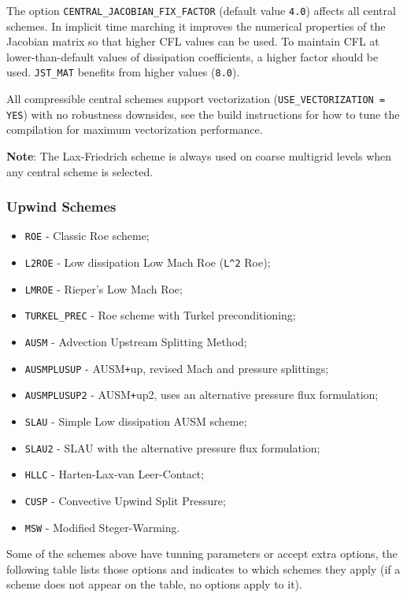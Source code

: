\documentclass[12pt, a4paper, twoside]{article}
\begin{document}
The option \verb|CENTRAL_JACOBIAN_FIX_FACTOR| (default value \verb|4.0|) affects all central schemes. In implicit time marching it improves the numerical properties of the Jacobian matrix so that higher CFL values can be used. To maintain CFL at lower-than-default values of dissipation coefficients, a higher factor should be used. \verb|JST_MAT| benefits from higher values (\verb|8.0|).

All compressible central schemes support vectorization (\texttt{USE\_VECTORIZATION = YES}) with no robustness downsides, see the build instructions for how to tune the compilation for maximum vectorization performance.

\textbf{Note}: The Lax-Friedrich scheme is always used on coarse multigrid levels when any central scheme is selected.

\subsubsection{Upwind Schemes}

\begin{itemize}
    \item \verb|ROE| - Classic Roe scheme;
    \item \verb|L2ROE| - Low dissipation Low Mach Roe (\verb|L^2| Roe);
    \item \verb|LMROE| - Rieper’s Low Mach Roe;
    \item \verb|TURKEL_PREC| - Roe scheme with Turkel preconditioning;
    \item \verb|AUSM| - Advection Upstream Splitting Method;
    \item \verb|AUSMPLUSUP| - AUSM\verb|+|up, revised Mach and pressure splittings;
    \item \verb|AUSMPLUSUP2| - AUSM\verb|+|up2, uses an alternative pressure flux formulation;
    \item \verb|SLAU| - Simple Low dissipation AUSM scheme;
    \item \verb|SLAU2| - SLAU with the alternative pressure flux formulation;
    \item \verb|HLLC| - Harten-Lax-van Leer-Contact;
    \item \verb|CUSP| - Convective Upwind Split Pressure;
    \item \verb|MSW| - Modified Steger-Warming.
\end{itemize}


Some of the schemes above have tunning parameters or accept extra options, the following table lists those options and indicates to which schemes they apply (if a scheme does not appear on the table, no options apply to it).
\end{document}
